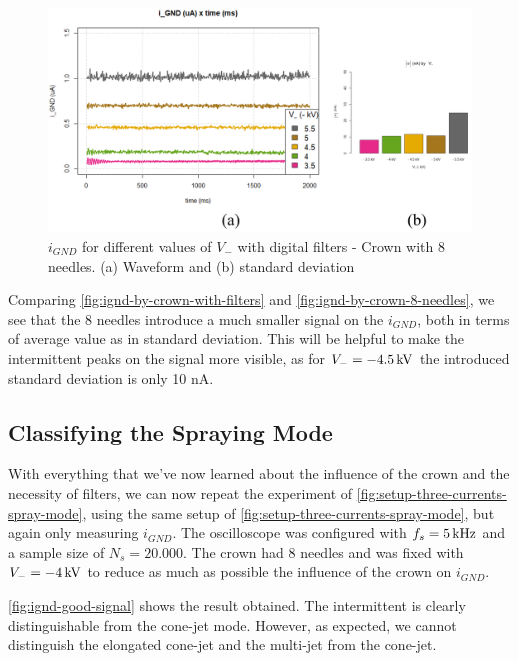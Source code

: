 \documentclass[oneside,12pt]{article}
\begin{document}
\begin{figure}[h!]
    \centering
    \includegraphics[width=1\textwidth,trim=1 1 1 1,clip]{figures/ignd-by-crown-8-needles.png}
    \caption{$i_{GND}$ for different values of $V_-$ with digital filters - Crown with 8 needles. (a) Waveform and (b) standard deviation}
    \label{fig:ignd-by-crown-8-needles}
\end{figure}

Comparing \autoref{fig:ignd-by-crown-with-filters} and \autoref{fig:ignd-by-crown-8-needles}, we see that the 8 needles introduce 
a much smaller signal on the $i_{GND}$, both in terms of average value as in standard deviation. This will be helpful to make  
the intermittent peaks on the signal more visible, as for $V_- = - 4.5 \,\mathrm{kV}$ the introduced standard deviation is only 10 nA.

\subsection{Classifying the Spraying Mode}

With everything that we've now learned about the influence of the crown and the necessity of filters, we can now repeat the experiment 
of \autoref{fig:setup-three-currents-spray-mode}, using the same setup of \autoref{fig:setup-three-currents-spray-mode}, but again only
measuring $i_{GND}$. The oscilloscope was configured with $f_s = 5 \,\mathrm{kHz}$ and a sample size of $N_s = 20.000$. The crown had 8 needles 
and was fixed with $V_- = - 4 \,\mathrm{kV}$ to reduce as much as possible the influence of the crown on $i_{GND}$.

\autoref{fig:ignd-good-signal} shows the result obtained. The intermittent is clearly distinguishable from the cone-jet mode. However, 
as expected, we cannot distinguish the elongated cone-jet and the multi-jet from the cone-jet.
\end{document}
